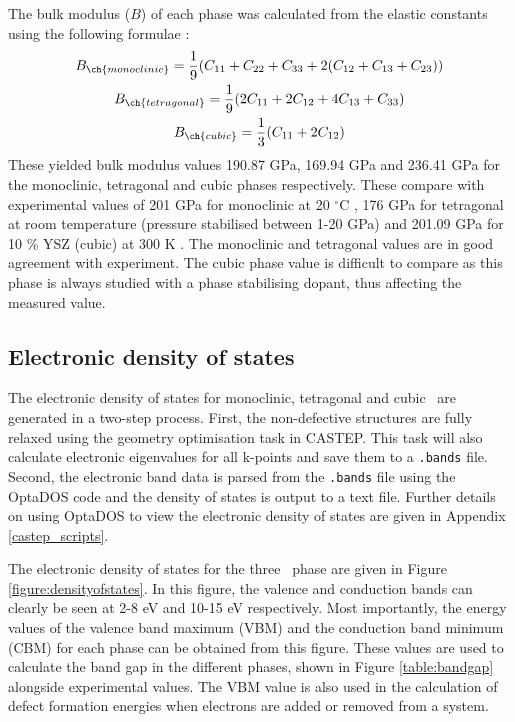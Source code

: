 The bulk modulus ($B$) of each phase was calculated from the elastic constants using the following formulae \cite{Watt1980, Wu2018, wu2017critical}:
\begin{gather}
B_{\ch{monoclinic}} = \frac{1}{9}(C_{11} + C_{22} + C_{33} + 2(C_{12} + C_{13} + C_{23})) \\
B_{\ch{tetragonal}} = \frac{1}{9}(2C_{11} + 2C_{12} + 4C_{13} + C_{33}) \\
B_{\ch{cubic}} = \frac{1}{3}(C_{11} + 2C_{12})
\end{gather}
These yielded bulk modulus values 190.87 GPa, 169.94 GPa and 236.41 GPa for the monoclinic, tetragonal and cubic phases respectively. These compare with experimental values of 201 GPa for monoclinic at 20 $^{\circ}$C \cite{Chan1991}, 176 GPa for tetragonal at room temperature (pressure stabilised between 1-20 GPa) \cite{Bouvier2000} and 201.09 GPa for 10 \% YSZ (cubic) at 300 K \cite{Cai1995}. The monoclinic and tetragonal values are in good agreement with experiment. The cubic phase value is difficult to compare as this phase is always studied with a phase stabilising dopant, thus affecting the measured value.

\subsection{Electronic density of states} 

The electronic density of states for monoclinic, tetragonal and cubic \zirconia\ are generated in a two-step process. First, the non-defective structures are fully relaxed using the geometry optimisation task in CASTEP. This task will also calculate electronic eigenvalues for all k-points and save them to a \texttt{.bands} file. Second, the electronic band data is parsed from the \texttt{.bands} file using the OptaDOS code \cite{Nicholls2012, Morris2014} and the density of states is output to a text file. Further details on using OptaDOS to view the electronic density of states are given in Appendix \ref{castep_scripts}.

The electronic density of states for the three \zirconia\ phase are given in Figure \ref{figure:densityofstates}. In this figure, the valence and conduction bands can clearly be seen at 2-8 eV and 10-15 eV respectively. Most importantly, the energy values of the valence band maximum (VBM) and the conduction band minimum (CBM) for each phase can be obtained from this figure. These values are used to calculate the band gap in the different phases, shown in Figure \ref{table:bandgap} alongside experimental values. The VBM value is also used in the calculation of defect formation energies when electrons are added or removed from a system.

